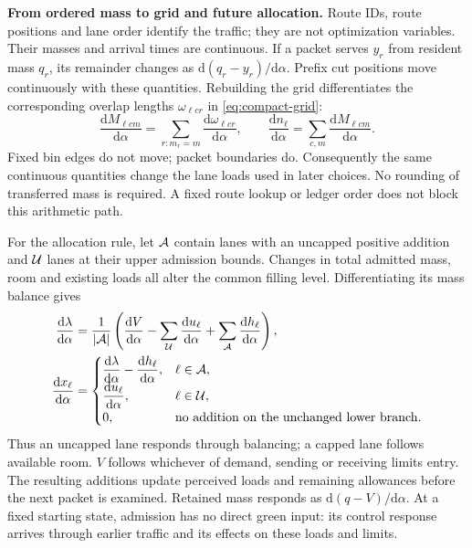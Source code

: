 \documentclass[10pt,a4paper]{article}
\newenvironment{revision}{\begingroup\color{revisionred}}{\par\endgroup}
\begin{document}
\begin{revision}
\textbf{From ordered mass to grid and future allocation.}
Route IDs, route positions and lane order identify the traffic; they are
not optimization variables. Their masses and arrival times are continuous.
If a packet serves $y_r$ from resident mass $q_r$, its remainder changes
as $\mathrm d(q_r-y_r)/\mathrm d\alpha$. Prefix cut positions move
continuously with these quantities. Rebuilding the grid differentiates
the corresponding overlap lengths $\omega_{\ell cr}$ in
\eqref{eq:compact-grid}:
\begin{equation}
 \frac{\mathrm dM_{\ell cm}}{\mathrm d\alpha}
 =\sum_{r:m_r=m}\frac{\mathrm d\omega_{\ell cr}}{\mathrm d\alpha},
 \qquad
 \frac{\mathrm dn_\ell}{\mathrm d\alpha}
 =\sum_{c,m}\frac{\mathrm dM_{\ell cm}}{\mathrm d\alpha}.
 \label{eq:compact-grid-derivative}
\end{equation}
Fixed bin edges do not move; packet boundaries do. Consequently the
same continuous quantities change the lane loads used in later choices.
No rounding of transferred mass is required. A fixed route lookup or
ledger order does not block this arithmetic path.

For the allocation rule, let ${\cal A}$ contain lanes with an uncapped
positive addition and ${\cal U}$ lanes at their upper admission bounds.
Changes in total admitted mass, room and existing loads all alter the
common filling level. Differentiating its mass balance gives
\begin{align}
 \frac{\mathrm d\lambda}{\mathrm d\alpha}
 &=\frac1{|{\cal A}|}\left(
 \frac{\mathrm dV}{\mathrm d\alpha}
 -\sum_{\cal U}\frac{\mathrm du_\ell}{\mathrm d\alpha}
 +\sum_{\cal A}\frac{\mathrm dh_\ell}{\mathrm d\alpha}\right),\nonumber\\
 \frac{\mathrm dx_\ell}{\mathrm d\alpha}
 &=\begin{cases}
 \displaystyle\frac{\mathrm d\lambda}{\mathrm d\alpha}
             -\frac{\mathrm dh_\ell}{\mathrm d\alpha},&\ell\in{\cal A},\\
 \displaystyle\frac{\mathrm du_\ell}{\mathrm d\alpha},&\ell\in{\cal U},\\
 0,&\text{no addition on the unchanged lower branch}.
 \end{cases}
 \label{eq:compact-allocation-derivative}
\end{align}
Thus an uncapped lane responds through balancing; a capped lane follows
available room. $V$ follows whichever of demand, sending or receiving
limits entry. The resulting additions update perceived loads and remaining
allowances before the next packet is examined. Retained mass responds as
$\mathrm d(q-V)/\mathrm d\alpha$. At a fixed starting state, admission
has no direct green input: its control response arrives through earlier
traffic and its effects on these loads and limits.


\end{revision}
\end{document}
